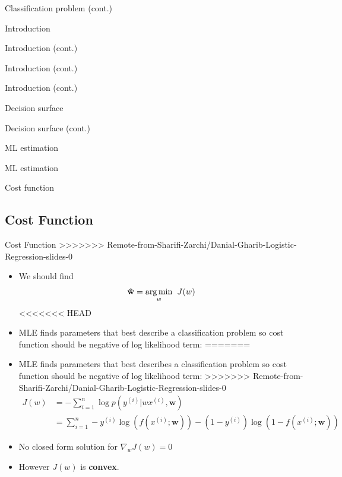 \documentclass[serif, aspectratio=169]{beamer}
\begin{document}
\begin{frame}{Classification problem (cont.)}
\begin{itemize}
\begin{frame}{Introduction}
\begin{itemize}
\begin{frame}{Introduction (cont.)}
\begin{frame}{Introduction (cont.)}
\begin{frame}{Introduction (cont.)}
\begin{frame}{Decision surface}
\begin{itemize}
\begin{frame}{Decision surface (cont.)}
\begin{frame}{ML estimation}
\begin{frame}{ML estimation}
\begin{itemize}
\begin{frame}{Cost function}
\subsection{Cost Function}
\begin{frame}{Cost Function}
>>>>>>> Remote-from-Sharifi-Zarchi/Danial-Gharib-Logistic-Regression-slides-0
    \begin{itemize}
    \item We should find 
        \begin{align*}
            \mathbf{\hat{w}} = \underset{w}{\arg\min} \hspace{0.2cm} J(w)
        \end{align*}
<<<<<<< HEAD
        \item MLE finds parameters that best describe a classification problem so cost function should be negative of log likelihood term:
=======
        \item MLE finds parameters that best describes a classification problem so cost function should be negative of log likelihood term:
>>>>>>> Remote-from-Sharifi-Zarchi/Danial-Gharib-Logistic-Regression-slides-0
        \begin{align*}
            J(w) &= -\sum_{i=1}^{n} \log p(y^{(i)}|wx^{(i)}, \mathbf{w})\\
            &= \sum_{i=1}^{n}-y^{(i)}\log (f(x^{(i)}; \mathbf{w})) - 
            (1-y^{(i)})\log (1 - f(x^{(i)}; \mathbf{w}))
        \end{align*}
        \item No closed form solution for $\nabla _w J(w) = 0$
        \item However $J(w)$ is \textbf{convex}.
    \end{itemize}
\end{frame}


\end{frame}
\end{itemize}
\end{frame}
\end{frame}
\end{frame}
\end{itemize}
\end{frame}
\end{frame}
\end{frame}
\end{frame}
\end{itemize}
\end{frame}
\end{itemize}
\end{frame}
\end{document}
